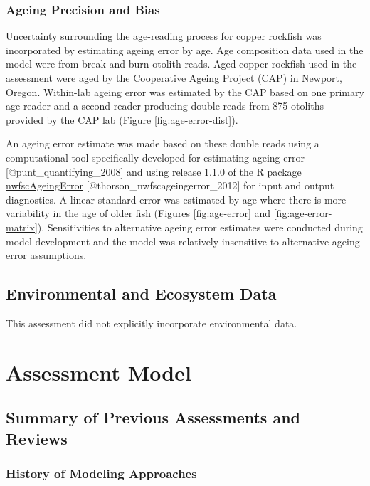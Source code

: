 \documentclass[11pt,
  letterpaper,
]{article}
\begin{document}
\subsubsection{Ageing Precision and Bias}\label{ageing-precision-and-bias}

Uncertainty surrounding the age-reading process for copper rockfish was incorporated by estimating ageing error by age. Age composition data used in the model were from break-and-burn otolith reads. Aged copper rockfish used in the assessment were aged by the Cooperative Ageing Project (CAP) in Newport, Oregon. Within-lab ageing error was estimated by the CAP based on one primary age reader and a second reader producing double reads from 875 otoliths provided by the CAP lab (Figure \ref{fig:age-error-dist}).

An ageing error estimate was made based on these double reads using a computational tool specifically developed for estimating ageing error {[}@punt\_quantifying\_2008{]} and using release 1.1.0 of the R package \href{https://github.com/pfmc-assessments/nwfscAgeingError}{nwfscAgeingError} {[}@thorson\_nwfscageingerror\_2012{]} for input and output diagnostics. A linear standard error was estimated by age where there is more variability in the age of older fish (Figures \ref{fig:age-error} and \ref{fig:age-error-matrix}). Sensitivities to alternative ageing error estimates were conducted during model development and the model was relatively insensitive to alternative ageing error assumptions.

\subsection{Environmental and Ecosystem Data}\label{environmental-and-ecosystem-data}

This assessment did not explicitly incorporate environmental data.

\section{Assessment Model}\label{assessment-model}

\subsection{Summary of Previous Assessments and Reviews}\label{summary-of-previous-assessments-and-reviews}

\subsubsection{History of Modeling Approaches}\label{history-of-modeling-approaches}
\end{document}
